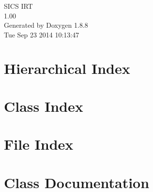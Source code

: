 \documentclass[twoside]{book}
\newcommand{\+}{\discretionary{\mbox{\scriptsize$\hookleftarrow$}}{}{}}
\newcommand{\clearemptydoublepage}{%
  \newpage{\pagestyle{empty}\cleardoublepage}%
}
\begin{document}
\hypersetup{pageanchor=false,
             bookmarks=true,
             bookmarksnumbered=true,
             pdfencoding=unicode
            }
\begin{titlepage}
\vspace*{7cm}
\begin{center}%
{\Large S\+I\+C\+S I\+R\+T \\[1ex]\large 1.\+00 }\\
\vspace*{1cm}
{\large Generated by Doxygen 1.8.8}\\
\vspace*{0.5cm}
{\small Tue Sep 23 2014 10:13:47}\\
\end{center}
\end{titlepage}
\clearemptydoublepage
\tableofcontents
\clearemptydoublepage
{}
\hypersetup{pageanchor=true}

\chapter{Hierarchical Index}

\chapter{Class Index}

\chapter{File Index}

\chapter{Class Documentation}

































\end{document}
